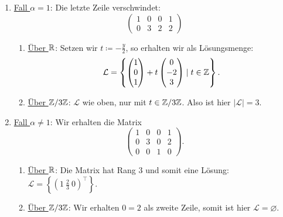 \begin{enumerate}
	\item \underline{Fall \( \alpha = 1 \)}: Die letzte Zeile verschwindet:
	\begin{equation*}
	 	\left( \begin{array}{ccc|c}
	 		1 & 0 & 0 & 1 \\
	 		0 & 3 & 2 & 2 
	 	\end{array} \right)
	 \end{equation*} 
	 \begin{enumerate}
	 	\item \underline{Über \( \mathbb{R} \)}: Setzen wir \( t \coloneqq - \tfrac{y}{2} \), so erhalten wir als Lösungsmenge:
	 	\begin{equation*}
	 	 	\mathcal{L} = \left \{ \begin{pmatrix}
	 	 		1 \\ 0 \\ 1
	 	 	\end{pmatrix} + t \begin{pmatrix}
	 	 		0 \\ -2 \\ 3
	 	 	\end{pmatrix} \mid t \in \mathbb{Z} \right \}\text{.}
	 	 \end{equation*} 

	 	 \item \underline{Über \( \mathbb{Z}/3\mathbb{Z} \)}: \( \mathcal{L} \) wie oben, nur mit \( t \in \mathbb{Z}/3\mathbb{Z} \). Also ist hier \( | \mathcal{L} | = 3 \).
	 \end{enumerate}

	 \item \underline{Fall \( \alpha \neq 1 \)}: Wir erhalten die Matrix
	 \begin{equation*}
	 	\left( \begin{array}{ccc|c}
	 		1 & 0 & 0 & 1 \\
	 		0 & 3 & 0 & 2 \\
	 		0 & 0 & 1 & 0 
	 	\end{array} \right)\text{.}
	 \end{equation*}
	 \begin{enumerate}
	 	\item \underline{Über \( \mathbb{R} \)}: Die Matrix hat Rang \( 3 \) und somit eine Lösung: \( \mathcal{L} = \left\{ \left( 1 \ \tfrac{2}{3} \ 0 \right)^\top \right\} \).
	 	\item \underline{Über \( \mathbb{Z}/3\mathbb{Z} \)}: Wir erhalten \( 0 = 2 \) als zweite Zeile, somit ist hier \( \mathcal{L} = \varnothing \).
	 \end{enumerate}
\end{enumerate}

